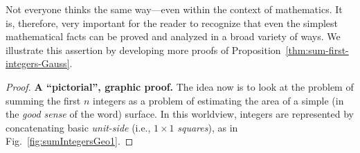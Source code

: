 \medskip

Not everyone thinks the same way---even within the context of
mathematics.  It is, therefore, very important for the reader to
recognize that even the simplest mathematical facts can be proved and
analyzed in a broad variety of ways.  We illustrate this assertion by
developing more proofs of
Proposition~\ref{thm:sum-first-integers-Gauss}.

\begin{proof}
{\bf A ``pictorial'', graphic proof.}
%
The idea now is to look at the problem of summing the first $n$
integers as a problem of estimating the area of a simple (in the
\textit{good sense} of the word) surface.  In this worldview, integers
are represented by concatenating basic {\it unit-side} (i.e., $1
\times 1$  {\it squares}), as in
Fig.~\ref{fig:sumIntegersGeo1}.


\end{proof}

